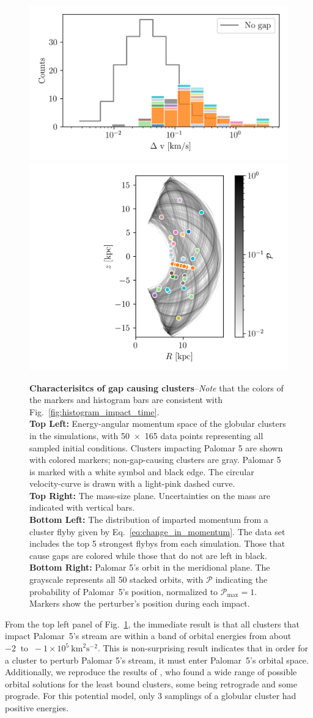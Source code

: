 \documentclass{aa}
\begin{document}
\begin{figure}
      \includegraphics[width=0.45\linewidth]{impact_geometry_statistics_deltaP.png}
      \includegraphics[width=0.45\linewidth]{impact_stats_phase_space.png}
      \caption{\textbf{Characterisitcs of gap causing clusters}--\textit{Note} that the colors of the markers and histogram bars are consistent with Fig.~\ref{fig:histogram_impact_time}.\\ \textbf{Top Left:} Energy-angular momentum space of the globular clusters in the simulations, with 50~$\times$~165 data points representing all sampled initial conditions. Clusters impacting Palomar 5 are shown with colored markers; non-gap-causing clusters are gray. Palomar 5 is marked with a white symbol and black edge. The circular velocity-curve is drawn with a light-pink dashed curve.\\ \textbf{Top Right:} The mass-size plane. Uncertainties on the mass are indicated with vertical bars. \\ \textbf{Bottom Left:} The distribution of imparted momentum from a cluster flyby given by Eq.~\ref{eq:change_in_momentum}. The data set includes the top 5 strongest flybys from each simulation. Those that cause gaps are colored while those that do not are left in black. \\ \textbf{Bottom Right:} Palomar 5's orbit in the meridional plane. The grayscale represents all 50 stacked orbits, with $\mathcal{P}$ indicating the probability of  Palomar~5's position, normalized to $\mathcal{P}_\textrm{max}=1$. Markers show the perturber's position during each impact.}
      \label{fig:mass_size_plane}
      \end{figure}


      From the top left panel of Fig.~\ref{fig:mass_size_plane}, the immediate result is that all clusters that impact Palomar~5's stream are within a band of orbital energies from about $-2~\textrm{ to }~-1 \times10^5~\textrm{km}^2\textrm{s}^{-2}$. This is non-surprising result indicates that in order for a cluster to perturb Palomar 5's stream, it must enter Palomar~5's orbital space. Additionally, we reproduce the results of \citet{2021MNRAS.505.5978V}, who found a wide range of possible orbital solutions for the least bound clusters, some being retrograde and some prograde. For this potential model, only 3 samplings of a globular cluster had positive energies. 
    
\end{document}
